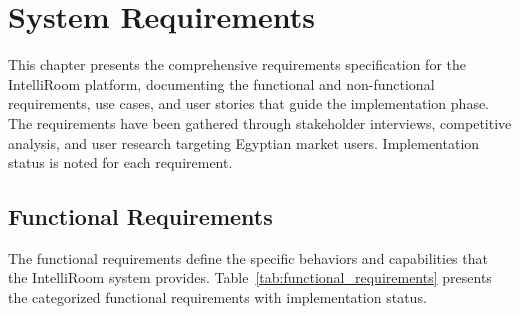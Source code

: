 
\chapter{System Requirements}
\label{chap:requirements}

This chapter presents the comprehensive requirements specification for the IntelliRoom platform, documenting the functional and non-functional requirements, use cases, and user stories that guide the implementation phase. The requirements have been gathered through stakeholder interviews, competitive analysis, and user research targeting Egyptian market users. Implementation status is noted for each requirement.

\section{Functional Requirements}
\label{sec:functional_requirements}

The functional requirements define the specific behaviors and capabilities that the IntelliRoom system provides. Table~\ref{tab:functional_requirements} presents the categorized functional requirements with implementation status.

